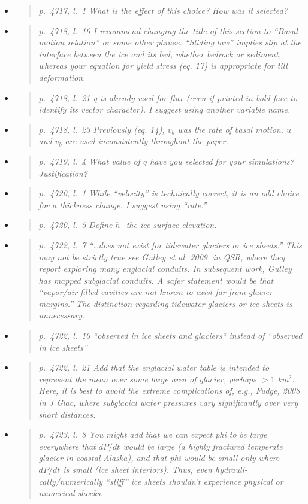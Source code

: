 \documentclass[11pt,reqno]{amsart}
\newcommand{\reply}[2]{
\medskip\medskip
\item  \begin{quote}
\emph{#1}
\end{quote}

\medskip
\noindent #2}
\begin{document}
\begin{itemize}
\reply{p.~4717, l.~1 What is the effect of this choice? How was it selected?}
{}

\reply{p.~4718, l.~16 I recommend changing the title of this section to “Basal motion relation”
or some other phrase. “Sliding law” implies slip at the interface between the ice and its
bed, whether bedrock or sediment, whereas your equation for yield stress (eq. 17) is
appropriate for till deformation.}
{}

\reply{p.~4718, l.~21 q is already used for flux (even if printed in bold-face to identify its vector
character). I suggest using another variable name.}
{}

\reply{p.~4718, l.~23 Previously (eq. 14), $v_b$ was the rate of basal motion. $u$ and $v_b$ are
used inconsistently throughout the paper.}
{}

\reply{p.~4719, l.~4 What value of $q$ have you selected for your simulations? Justification?}
{}

\reply{p.~4720, l.~1  While “velocity” is technically correct, it is an odd choice for a thickness
change. I suggest using “rate.”}
{}

\reply{p.~4720, l.~5 Define $h$- the ice surface elevation.}
{}

\reply{p.~4722, l.~7 “\dots does not exist for tidewater glaciers or ice sheets.” This may not
be strictly true see Gulley et al, 2009, in QSR, where they report exploring many
englacial conduits. In subsequent work, Gulley has mapped subglacial conduits. A
safer statement would be that “vapor/air-filled cavities are not known to exist far from
glacier margins.”  The distinction regarding tidewater glaciers or ice sheets is unnecessary.}
{}

\reply{p.~4722, l.~10 “observed in ice sheets and glaciers“ instead of “observed in ice sheets”}
{}

\reply{p.~4722, l.~21 Add that the englacial water table is intended to represent the mean
over some large area of glacier, perhaps $>1$ km$^2$. Here, it is best to avoid the extreme
complications of, e.g., Fudge, 2008 in J Glac, where subglacial water pressures vary
significantly over very short distances.}
{}

\reply{p.~4723, l.~8 You might add that we can expect phi to be large everywhere that $dP/dt$
would be large (a highly fractured temperate glacier in coastal Alaska), and that phi
would be small only where $dP/dt$ is small (ice sheet interiors). Thus, even hydrauli-
cally/numerically “stiff” ice sheets shouldn’t experience physical or numerical shocks.}
{}


\end{itemize}
\end{document}
